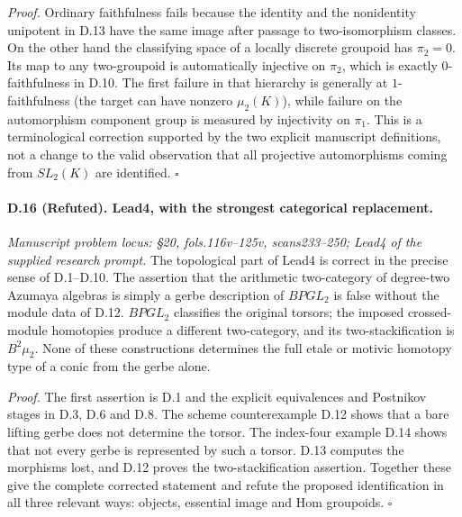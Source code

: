 \emph{Proof.} Ordinary faithfulness fails because the identity and the nonidentity unipotent in D.13 have the same image after passage to two-isomorphism classes. On the other hand the classifying space of a locally discrete groupoid has $\pi_2=0$. Its map to any two-groupoid is automatically injective on $\pi_2$, which is exactly $0$-faithfulness in D.10. The first failure in that hierarchy is generally at $1$-faithfulness (the target can have nonzero $\mu_2(K)$), while failure on the automorphism component group is measured by injectivity on $\pi_1$. This is a terminological correction supported by the two explicit manuscript definitions, not a change to the valid observation that all projective automorphisms coming from $SL_2(K)$ are identified. \hfill$\square$

\paragraph{D.16 (Refuted). Lead4, with the strongest categorical replacement.}
\emph{Manuscript problem locus: \S20, fols.116v--125v, scans233--250; Lead4 of the supplied research prompt.}
The topological part of Lead4 is correct in the precise sense of D.1--D.10. The assertion that the arithmetic two-category of degree-two Azumaya algebras is simply a gerbe description of $BPGL_2$ is false without the module data of D.12. $BPGL_2$ classifies the original torsors; the imposed crossed-module homotopies produce a different two-category, and its two-stackification is $B^2\mu_2$. None of these constructions determines the full etale or motivic homotopy type of a conic from the gerbe alone.

\emph{Proof.} The first assertion is D.1 and the explicit equivalences and Postnikov stages in D.3, D.6 and D.8. The scheme counterexample D.12 shows that a bare lifting gerbe does not determine the torsor. The index-four example D.14 shows that not every gerbe is represented by such a torsor. D.13 computes the morphisms lost, and D.12 proves the two-stackification assertion. Together these give the complete corrected statement and refute the proposed identification in all three relevant ways: objects, essential image and Hom groupoids. \hfill$\square$
